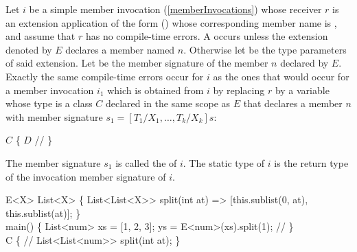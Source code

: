 \documentclass[makeidx]{article}
\begin{document}
\LMHash{}%
%
Let $i$ be a simple member invocation
(\ref{memberInvocations})
whose receiver $r$ is an extension application of the form
%
()
whose corresponding member name is ,
and assume that $r$ has no compile-time errors.
A  occurs unless the extension denoted by $E$
declares a member named $n$.
Otherwise let  be
the type parameters of said extension.
Let  be the member signature of the member $n$ declared by $E$.
Exactly the same compile-time errors occur for $i$ as
the ones that would occur for a member invocation $i_1$
which is obtained from $i$ by replacing $r$ by
a variable whose type is
a class $C$ declared in the same scope as $E$
that declares a member $n$ with member signature
$s_1 = [T_1/X_1, \ldots, T_k/X_k]s$:

\begin{normativeDartCode}
\ABSTRACT{} \CLASS{} $C$ \{
  $D$ // 
\}
\end{normativeDartCode}

\LMHash{}%
The member signature $s_1$ is called the
of $i$.
The static type of $i$ is the return type of
the invocation member signature of $i$.

\begin{dartCode}
\EXTENSION{} E<X> \ON{} List<X> \{
  List<List<X>{}> split(int at) =>
      [this.sublist(0, at), this.sublist(at)];
\}
\\
\VOID{} main() \{
  List<num> xs = [1, 2, 3];
  \VAR{} ys = E<num>(xs).split(1); // \comment{(*)}
\}
\\
\ABSTRACT{} \CLASS{} C \{
  // 
  List<List<num>{}> split(int at);
\}
\end{dartCode}

\end{document}
